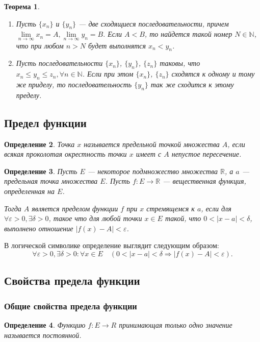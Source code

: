 \documentclass[12pt]{report}
\theoremstyle{plain}
\newtheorem{theorem}{Теорема}[chapter]
\newtheorem{definition}[theorem]{Определение}
\newcommand{\R}{\mathbb R}
\newcommand{\N}{\mathbb N}
\begin{document}
\begin{theorem}
\begin{enumerate}
  \item Пусть $\{x_n\}$ и $\{y_n\}$ --- две сходящиеся последовательности, причем
    $\lim\limits_{n\rightarrow\infty} x_n = A, \lim\limits_{n\rightarrow\infty} y_n = B.$
    Если $A < B$, то найдется такой номер $N \in \N$, что при любом $n > N$ будет выполнятся
    $x_n < y_n$.
  \item Пусть последовательности $\{x_n\}$, $\{y_n\}$, $\{z_n\}$ таковы, что $x_n \le y_n \le z_n, \forall n \in \N$.
    Если при этом $\{x_n\}$, $\{z_n\}$ сходятся к одному и тому же приделу, то последовательность
    $\{y_n\}$ так же сходится к этому пределу.
\end{enumerate}
\end{theorem}

\subsection{Предел функции}
\begin{definition}
Точка $x$ называется предельной точкой множества $A$, если всякая проколотая окрестность точки
$x$ имеет с $A$ непустое пересечение.
\end{definition}

\begin{definition}
Пусть $E$ --- некоторое подмножество множества $\R$, а $a$ --- предельная точка множества
$E$. Пусть $f: E \rightarrow \R$ --- вещественная функция, определенная на $E$.


Тогда $A$ является пределом функции $f$ при $x$ стремящемся к $a$, если для
$\forall \varepsilon > 0, \exists \delta > 0$, такое что для любой точки 
$x \in E$ такой, что $ 0 < |x - a| < \delta$, выполнено отношение $|f(x) - A| < \varepsilon$.
\end{definition}

В логической символике определение выглядит следующим образом:
$$
\forall \varepsilon > 0, \exists \delta > 0: \forall x \in E \quad (0 < |x - a| < \delta \Rightarrow |f(x) - A| < \varepsilon).
$$

\subsection{Свойства предела функции}
\subsubsection{Общие свойства предела функции}
\begin{definition}
  Функцию $f: E \rightarrow R$ принимающая только одно значение называется постоянной.
\end{definition}
\end{document}
